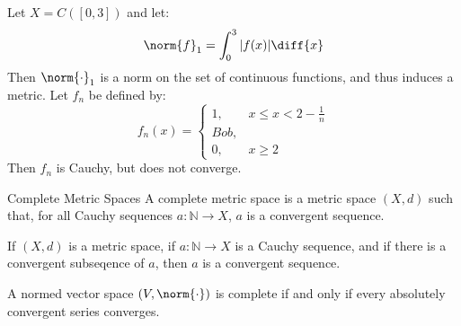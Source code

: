 \documentclass[crop=false,class=article,oneside]{standalone}
\begin{document}
            \begin{lexample}
                Let $X=C([0,3])$ and let:
                \begin{equation}
                    \norm{f}_{1}=\int_{0}^{3}|f(x)|\diff{x}
                \end{equation}
                Then $\norm{\cdot}_{1}$ is a norm on the set of
                continuous functions, and thus induces a metric.
                Let $f_{n}$ be defined by:
                \begin{equation}
                    f_{n}(x)=
                    \begin{cases}
                        1,&x\leq{x}<2-\frac{1}{n}\\
                        Bob,\\
                        0,&x\geq{2}
                    \end{cases}
                \end{equation}
                Then $f_{n}$ is Cauchy, but does not converge.
            \end{lexample}
            \begin{ldefinition}{Complete Metric Spaces}
                A complete metric space is a metric space $(X,d)$ such
                that, for all Cauchy sequences
                $a:\mathbb{N}\rightarrow{X}$, $a$ is a convergent
                sequence.
            \end{ldefinition}
            \begin{theorem}
                If $(X,d)$ is a metric space, if
                $a:\mathbb{N}\rightarrow{X}$ is a Cauchy sequence,
                and if there is a convergent subseqence of $a$, then
                $a$ is a convergent sequence.
            \end{theorem}
            \begin{theorem}
                A normed vector space $(V,\norm{\cdot})$ is complete
                if and only if every absolutely convergent series
                converges.
            \end{theorem}
\end{document}
